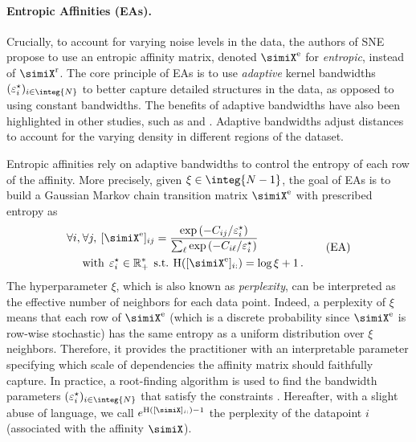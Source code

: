 \paragraph{Entropic Affinities (EAs).}
Crucially, to account for varying noise levels in the data, the authors of SNE propose to use an entropic affinity matrix, denoted $\simiX^{\mathrm{e}}$ for \emph{entropic}, instead of $\simiX^{\mathrm{r}}$. The core principle of EAs \citep{hinton2002stochastic} is to use \emph{adaptive} kernel bandwidths $(\varepsilon^\star_i)_{i \in \integ{N}}$ to better capture detailed structures in the data, as opposed to using constant bandwidths. The benefits of adaptive bandwidths have also been highlighted in other studies, such as \citep{van2018recovering} and \citep{zelnik2004self}. Adaptive bandwidths adjust distances to account for the varying density in different regions of the dataset.

Entropic affinities rely on adaptive bandwidths to control the entropy of each row of the affinity. More precisely, given $\xi \in \integ{N-1}$, the goal of EAs is to build a Gaussian Markov chain transition matrix $\simiX^{\mathrm{e}}$ with prescribed entropy as
\begin{equation}
\begin{split}
    \forall i, \: &\forall j, \: [\simiX^{\mathrm{e}}]_{ij} = \frac{\exp{(-C_{ij}/\varepsilon^\star_i)}}{\sum_\ell \exp{(-C_{i\ell}/\varepsilon^\star_i)}} \\
    &\text{with} \:\: \varepsilon^\star_i \in \mathbb{R}^*_+ \:\: \text{s.t.} \: \operatorname{H}([\simiX^{\mathrm{e}}]_{i:}) = \log{\xi} + 1\,. \label{eq:entropic_affinity_pb}
\end{split}\tag{EA}
\end{equation}
The hyperparameter $\xi$, which is also known as \emph{perplexity}, can be interpreted as the effective number of neighbors for each data point. Indeed, a perplexity of $\xi$ means that each row of $\simiX^{\mathrm{e}}$ (which is a discrete probability since $\simiX^{\mathrm{e}}$ is row-wise stochastic) has the same entropy as a uniform distribution over $\xi$ neighbors. Therefore, it provides the practitioner with an interpretable parameter specifying which scale of dependencies the affinity matrix should faithfully capture. In practice, a root-finding algorithm is used to find the bandwidth parameters $(\varepsilon_i^\star)_{i \in \integ{N}}$ that satisfy the constraints \citep{vladymyrov2013entropic}. Hereafter, with a slight abuse of language, we call $e^{\operatorname{H}([\simiX]_{i:})-1}$ the perplexity of the datapoint $i$ (associated with the affinity $\simiX$).

